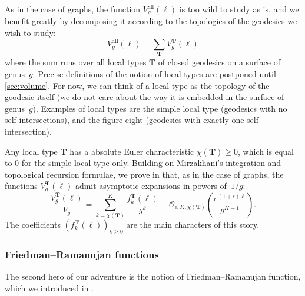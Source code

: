 \documentclass[12pt,twoside]{article}
\theoremstyle{theorem}
\theoremstyle{remark}
\theoremstyle{definition}
\theoremstyle{example}
\newcommand{\1}[1]{\mathds{1}_{#1}}
\renewcommand{\O}[2][ ]{\mathcal{O}_{#1} \left( #2 \right)}
\newcommand{\type}{\mathbf{T}}
\newcommand{\ord}{K}
\begin{document}
As in the case of graphs, the function $V_g^{\mathrm{all}}(\ell)$ is too wild to study as is, and we
benefit greatly by decomposing it according to the topologies of the geodesics we wish to study:
\begin{equation}
  \label{eq:vall_type}
  V_g^{\mathrm{all}}(\ell) = \sum_{\type} V_g^\type(\ell)
\end{equation}
where the sum runs over all local types $\type$ of closed geodesics on a surface of
genus~$g$. Precise definitions of the notion of local types are postponed until
\cref{sec:volume}. For now, we can think of a local type as the topology of the geodesic itself (we
do not care about the way it is embedded in the surface of genus~$g$). Examples of local types are
the simple local type (geodesics with no self-intersections), and the figure-eight (geodesics with
exactly one self-intersection).

Any local type $\type$ has a absolute Euler characteristic $\chi(\type) \geq 0$, which is equal to
$0$ for the simple local type only.  Building on Mirzakhani's integration and topological recursion
formulae, we prove in \cite{anantharaman2023} that, as in the case of graphs, the functions
$V_g^\type(\ell)$ admit asymptotic expansions in powers of~$1/g$:
\begin{equation}
  \label{eq:vtype_exp}
  \frac{V_g^\type(\ell)}{V_g}
  = \sum_{k=\chi(\type)}^{\ord} \frac{f_k^\type(\ell)}{g^k} + \O[\epsilon,\ord,\chi(\type)]{\frac{e^{(1+\epsilon)\ell}}{g^{\ord+1}}}.
\end{equation}
The coefficients $(f_k^\type(\ell))_{k \geq 0}$ are the main characters of this story. 

\subsubsection{Friedman--Ramanujan functions}
\label{sec:friedm-raman-funct}

The second hero of our adventure is the notion of Friedman--Ramanujan function, which we introduced
in \cite{anantharaman2023}. 
\end{document}
